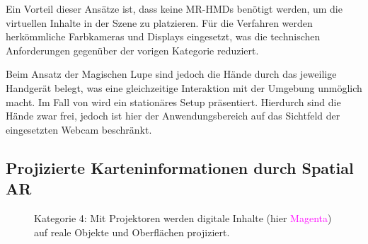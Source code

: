 Ein Vorteil dieser Ansätze ist, dass keine MR-HMDs benötigt werden, um die virtuellen Inhalte in der Szene zu platzieren.
Für die Verfahren werden herkömmliche Farbkameras und Displays eingesetzt, was die technischen Anforderungen gegenüber der vorigen Kategorie reduziert.

Beim Ansatz der Magischen Lupe sind jedoch die Hände durch das jeweilige Handgerät belegt, was eine gleichzeitige Interaktion mit der Umgebung unmöglich macht.
Im Fall von \textcite{Moore2005} wird ein stationäres Setup präsentiert.
Hierdurch sind die Hände zwar frei, jedoch ist hier der Anwendungsbereich auf das Sichtfeld der eingesetzten Webcam beschränkt.

\subsection{Projizierte Karteninformationen durch Spatial AR}
\begin{figure}[h]
    \centering
    \caption{Kategorie 4: Mit Projektoren werden digitale Inhalte (hier \textcolor{magenta}{Magenta}) auf reale Objekte und Oberflächen projiziert.}
    \label{fig:sketch_ar_projected}
\end{figure}

